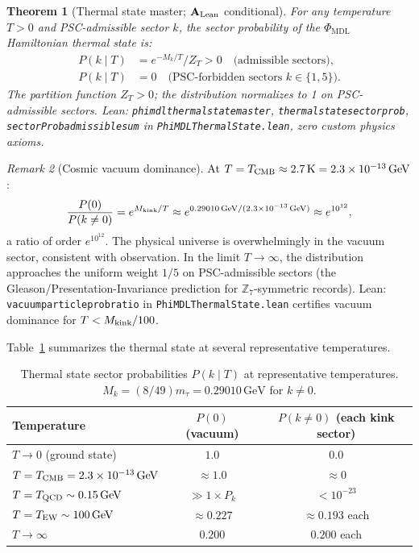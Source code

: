 \documentclass[11pt]{article}
\newtheorem{theorem}{Theorem}[section]
\theoremstyle{remark}
\newtheorem{remark}[theorem]{Remark}
\newcommand{\PHIMDL}{\Phi_{\mathrm{MDL}}}
\newcommand{\ZS}{\mathbb{Z}_7}
\newcommand{\lean}[1]{%
  \penalty-100
  \begingroup\def\_{\textunderscore\allowbreak}\texttt{#1}\endgroup}
\newcommand{\Mkink}{M_{\rm kink}}
\newcommand{\mtau}{m_\tau}
\newcommand{\CatAL}{\ensuremath{\textbf{A}_{\rm Lean}}}
\begin{document}
\begin{theorem}[Thermal state master; $\CatAL$ conditional]
  \label{thm:thermal}
  For any temperature $T>0$ and PSC-admissible sector $k$, the sector
  probability of the $\PHIMDL$ Hamiltonian thermal state is:
  \begin{align}
    P(k\mid T) &= e^{-M_k/T}/Z_T > 0 \quad\text{(admissible sectors)},
    \label{eq:thermal_admissible}\\
    P(k\mid T) &= 0 \quad\text{(PSC-forbidden sectors } k\in\{1,5\}).
    \label{eq:thermal_forbidden}
  \end{align}
  The partition function $Z_T > 0$; the distribution normalizes to 1 on
  PSC-admissible sectors.  Lean: \lean{phimdl\_thermal\_state\_master},
  \lean{thermal\_state\_sector\_prob},
  \lean{sectorProb\_admissible\_sum} in \lean{PhiMDLThermalState.lean},
  zero custom physics axioms.
\end{theorem}

\begin{remark}[Cosmic vacuum dominance]
  At $T = T_{\rm CMB} \approx 2.7\,\mathrm{K} = 2.3\times10^{-13}\,\mathrm{GeV}$:
  \begin{equation}
    \frac{P(0)}{P(k\neq 0)} = e^{\Mkink/T}
    \approx e^{0.29010\,\mathrm{GeV}/(2.3\times10^{-13}\,\mathrm{GeV})}
    \approx e^{10^{12}},
  \end{equation}
  a ratio of order $e^{10^{12}}$.  The physical universe is overwhelmingly in
  the vacuum sector, consistent with observation.  In the limit $T\to\infty$, the
  distribution approaches the uniform weight $1/5$ on PSC-admissible sectors
  (the Gleason/Presentation-Invariance prediction for $\ZS$-symmetric records).
  Lean: \lean{vacuum\_particle\_prob\_ratio} in
  \lean{PhiMDLThermalState.lean} certifies vacuum dominance for $T < \Mkink/100$.
\end{remark}

Table~\ref{tab:thermal} summarizes the thermal state at several representative
temperatures.

\begin{table}[h]
\centering
\caption{Thermal state sector probabilities $P(k\mid T)$ at representative temperatures.
  $M_k = (8/49)\mtau = 0.29010\,\mathrm{GeV}$ for $k\neq 0$.}
\label{tab:thermal}
\begin{tabular}{lcc}
\toprule
Temperature & $P(0)$ (vacuum) & $P(k\neq 0)$ (each kink sector) \\
\midrule
$T\to 0$ (ground state) & $1.0$ & $0.0$ \\
$T = T_{\rm CMB} = 2.3\times10^{-13}\,\mathrm{GeV}$ & $\approx 1.0$ & $\approx 0$ \\
$T = T_{\rm QCD} \sim 0.15\,\mathrm{GeV}$ & $\gg 1 \times P_k$ & $< 10^{-23}$ \\
$T = T_{\rm EW} \sim 100\,\mathrm{GeV}$ & $\approx 0.227$ & $\approx 0.193$ each \\
$T\to\infty$ & $0.200$ & $0.200$ each \\
\bottomrule
\end{tabular}
\end{table}
\end{document}
